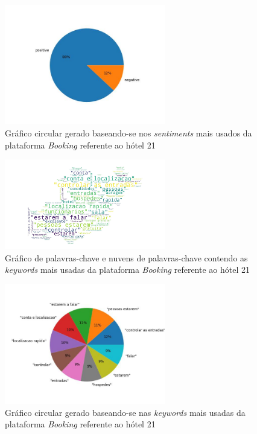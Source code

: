 \begin{figure}[!htb]
\centering
\includegraphics[width=7cm]{figuras/Booking/hotel21_sentiments.jpeg}
\caption{Gráfico circular gerado baseando-se nos \textit{sentiments} mais usados da plataforma \textit{Booking} referente ao hótel 21}
\label{fig:exemplofig}
\end{figure}

\begin{figure}[!htb]
\centering
\includegraphics[width=7cm]{figuras/Booking/hotel21_keywordcloud.jpeg}
\caption{Gráfico de palavras-chave e nuvens de palavras-chave contendo as \textit{keywords} mais usadas da plataforma \textit{Booking} referente ao hótel 21}
\label{fig:exemplofig}
\end{figure}

\begin{figure}[!htb]
\centering
\includegraphics[width=7cm]{figuras/Booking/hotel21_keywords.jpeg}
\caption{Gráfico circular gerado baseando-se nas \textit{keywords} mais usadas da plataforma \textit{Booking} referente ao hótel 21}
\label{fig:exemplofig}
\end{figure}

